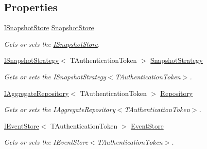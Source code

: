 \subsection*{Properties}
\begin{DoxyCompactItemize}
\item 
\hyperlink{interfaceCqrs_1_1Snapshots_1_1ISnapshotStore}{I\+Snapshot\+Store} \hyperlink{classCqrs_1_1Snapshots_1_1SnapshotRepository_aba01e9f20eb41e6f3e4476a7f3182275_aba01e9f20eb41e6f3e4476a7f3182275}{Snapshot\+Store}
\begin{DoxyCompactList}\small\item\em Gets or sets the \hyperlink{interfaceCqrs_1_1Snapshots_1_1ISnapshotStore}{I\+Snapshot\+Store}. \end{DoxyCompactList}\item 
\hyperlink{interfaceCqrs_1_1Snapshots_1_1ISnapshotStrategy}{I\+Snapshot\+Strategy}$<$ T\+Authentication\+Token $>$ \hyperlink{classCqrs_1_1Snapshots_1_1SnapshotRepository_a7d65b4df10d0b6f75c911a9b6d59b3ba_a7d65b4df10d0b6f75c911a9b6d59b3ba}{Snapshot\+Strategy}
\begin{DoxyCompactList}\small\item\em Gets or sets the I\+Snapshot\+Strategy$<$\+T\+Authentication\+Token$>$. \end{DoxyCompactList}\item 
\hyperlink{interfaceCqrs_1_1Domain_1_1IAggregateRepository}{I\+Aggregate\+Repository}$<$ T\+Authentication\+Token $>$ \hyperlink{classCqrs_1_1Snapshots_1_1SnapshotRepository_a64b1457cd45056fb7affd2aa8cd07d9e_a64b1457cd45056fb7affd2aa8cd07d9e}{Repository}
\begin{DoxyCompactList}\small\item\em Gets or sets the I\+Aggregate\+Repository$<$\+T\+Authentication\+Token$>$. \end{DoxyCompactList}\item 
\hyperlink{interfaceCqrs_1_1Events_1_1IEventStore}{I\+Event\+Store}$<$ T\+Authentication\+Token $>$ \hyperlink{classCqrs_1_1Snapshots_1_1SnapshotRepository_a34f46341da207beab43bb96b20514976_a34f46341da207beab43bb96b20514976}{Event\+Store}
\begin{DoxyCompactList}\small\item\em Gets or sets the I\+Event\+Store$<$\+T\+Authentication\+Token$>$. \end{DoxyCompactList}\item 

\end{DoxyCompactItemize}
